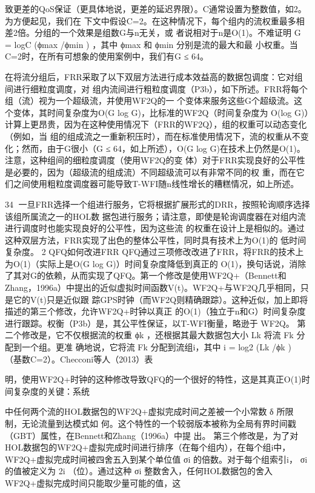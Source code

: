 致更差的QoS保证（更具体地说，更差的延迟界限）。C通常设置为整数值，如2。为方便起见，我们在
下文中假设C=2。在这种情况下，每个组内的流权重最多相差2倍。分组的一个效果是组数G与n无关，或
者说相对于n是O(1)。不难证明 G = logC (ϕmax /ϕmin ) ，其中 ϕmax 和 ϕmin 分别是流的最大和最
小权重。当C=2时，在所有可想象的使用案例中，我们有G ≤ 64。
                          ​       ​   ​           ​   ​




在将流分组后，FRR采取了以下双层方法进行成本效益高的数据包调度：它对组间进行细粒度调度，对
组内流间进行粗粒度调度（P3b），如下所述。FRR将每个组（流）视为一个超级流，并使用WF2Q的一
个变体来服务这些G个超级流。这个变体，其时间复杂度为O(G log G)，比标准的WF2Q（时间复杂度为
O(log G)）计算上更昂贵，因为在这种使用情况下（FRR的WF2Q），组的权重可以动态变化（例如，当
组的组成流之一重新积压时），而在标准使用情况下，流的权重从不变化；然而，由于G很小（G ≤
64，如上所述），O(G log G)在技术上仍然是O(1)。注意，这种组间的细粒度调度（使用WF2Q的变
体）对于FRR实现良好的公平性是必要的，因为（超级流的组成流）不同超级流可以有非常不同的权
重，而在它们之间使用粗粒度调度器可能导致T-WFI随n线性增长的糟糕情况，如上所述。

                                                               34
一旦FRR选择一个组进行服务，它将根据扩展形式的DRR，按照轮询顺序选择该组所属流之一的HOL数
据包进行服务；请注意，即使是轮询调度器在对组内流进行调度时也能实现良好的公平性，因为这些流
的权重在设计上是相似的。通过这种双层方法，FRR实现了出色的整体公平性，同时具有技术上为O(1)的
低时间复杂度。
2 QFQ如何改进FRR
QFQ通过三项修改改进了FRR，将FRR的技术上为O(1)（实际上是O(G log G)）时间复杂度降低到真正的
O(1)，换句话说，消除了其对G的依赖，从而实现了QFQ。第一个修改是使用WF2Q+（Bennett和
Zhang，1996a）中提出的近似虚拟时间函数V(t)。WF2Q+与WF2Q几乎相同，只是它的V(t)只是近似跟
踪GPS时钟（而WF2Q则精确跟踪）。这种近似，加上即将描述的第三个修改，允许WF2Q+时钟以真正
的O(1)（独立于n和G）时间复杂度进行跟踪。权衡（P3b）是，其公平性保证，以T-WFI衡量，略逊于
WF2Q。
第二个修改是，它不仅根据流的权重 ϕk ，还根据其最大数据包大小 Lk 将流 Fk 分配到一个组。更准
确地说，它将流 Fk 分配到流组i，其中 i = log2 (Lk /ϕk ) （基数C=2）。Checconi等人（2013）表
                         ​                     ​       ​




明，使用WF2Q+时钟的这种修改导致QFQ的一个很好的特性，这是其真正O(1)时间复杂度的关键：系统
            ​                      ​   ​   ​




中任何两个流的HOL数据包的WF2Q+虚拟完成时间之差被一个小常数 δ 所限制，无论流量到达模式如
何。这个特性的一个较弱版本被称为全局有界时间戳（GBT）属性，在Bennett和Zhang（1996a）中提
出。
第三个修改是，为了对HOL数据包的WF2Q+虚拟完成时间进行排序（在每个组内），在每个组i中，
WF2Q+虚拟完成时间被四舍五入到某个单位值 σi 的倍数。对于每个组索引i， σi 的值被定义为 2i
（位）。通过这种 σi 整数舍入，任何HOL数据包的舍入WF2Q+虚拟完成时间只能取少量可能的值，这
                               ​                   ​




